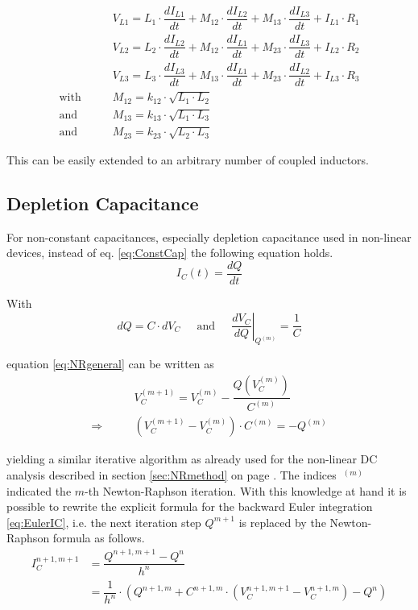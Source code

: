 \begin{align}
 & V_{L1} = L_1\cdot\dfrac{d I_{L1}}{d t} + M_{12}\cdot\dfrac{d I_{L2}}{d t}
          + M_{13}\cdot\dfrac{d I_{L3}}{d t} + I_{L1}\cdot R_1 \\
 & V_{L2} = L_2\cdot\dfrac{d I_{L2}}{d t} + M_{12}\cdot\dfrac{d I_{L1}}{d t}
          + M_{23}\cdot\dfrac{d I_{L3}}{d t} + I_{L2}\cdot R_2 \\
 & V_{L3} = L_3\cdot\dfrac{d I_{L3}}{d t} + M_{13}\cdot\dfrac{d I_{L1}}{d t}
          + M_{23}\cdot\dfrac{d I_{L2}}{d t} + I_{L3}\cdot R_3 \\
\text{with}\qquad & M_{12} = k_{12}\cdot\sqrt{L_1\cdot L_2} \\
\text{and}\qquad  & M_{13} = k_{13}\cdot\sqrt{L_1\cdot L_3} \\
\text{and}\qquad  & M_{23} = k_{23}\cdot\sqrt{L_2\cdot L_3}
\end{align}

This can be easily extended to an arbitrary number of coupled
inductors.


\subsection{Depletion Capacitance}

For non-constant capacitances, especially depletion capacitance used
in non-linear devices, instead of eq. \eqref{eq:ConstCap} the
following equation holds.
\begin{equation}
I_C(t) = \dfrac{d Q}{d t}
\end{equation}

With
\begin{equation}
d Q = C\cdot d V_C
\;\;\;\; \textrm{ and } \;\;\;\;
\left.\dfrac{d V_C}{d Q}\right|_{Q^{(m)}} = \dfrac{1}{C}
\end{equation}

equation \eqref{eq:NRgeneral} can be written as
\begin{align}
 & V_C^{(m + 1)} = V_C^{(m)} - \dfrac{Q\left(V_C^{(m)}\right)}{C^{(m)}} \\
\Rightarrow\qquad & \left( V_C^{(m + 1)} - V_C^{(m)} \right) \cdot C^{(m)} = - Q^{(m)}
\end{align}

yielding a similar iterative algorithm as already used for the
non-linear DC analysis described in section \ref{sec:NRmethod} on page
\pageref{sec:NRmethod}.  The indices $~^{(m)}$ indicated the $m$-th
Newton-Raphson iteration.  With this knowledge at hand it is possible
to rewrite the explicit formula for the backward Euler integration
\eqref{eq:EulerIC}, i.e. the next iteration step $Q^{m+1}$ is replaced by
the Newton-Raphson formula as follows.
\begin{equation}
\label{eqn:nl_cap_trans}
\begin{split}
I_C^{n+1,m+1} &= \dfrac{Q^{n+1,m+1} - Q^{n}}{h^{n}}\\
&= \dfrac{1}{h^{n}}\cdot \left( Q^{n+1,m} + C^{n+1,m}\cdot (V_C^{n+1,m+1} - V_C^{n+1,m}) - Q^{n} \right)
\end{split}
\end{equation}

